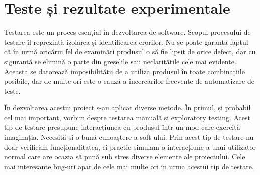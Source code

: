 
\chapter{Teste și rezultate experimentale}
\label{cap:rezultate}

%
%
%

Testarea este un proces esențial în dezvoltarea de software. Scopul procesului de testare îl reprezintă izolarea și identificarea erorilor. Nu se poate garanta faptul că în urmă oricărui fel de examinări produsul o să fie lipsit de orice defect, dar cu siguranță se elimină o parte din greșelile sau neclaritățile cele mai evidente. Aceasta se datorează imposibilității de a utiliza produsul în toate combinațiile posibile, dar de multe ori este o cauză a încercărilor frecvente de automatizare de teste.

În dezvoltarea acestui proiect s-au aplicat diverse metode. În primul, și probabil cel mai important, vorbim despre testarea manuală și exploratory testing. Acest tip de testare presupune interacțiunea cu produsul într-un mod care exercită imaginația. Necesită și o bună cunoaștere a soft-ului. Prin acest tip de testare nu doar verificăm funcționalitatea, ci practic simulam o interacțiune a unui utilizator normal care are ocazia să pună sub stres diverse elemente ale proiectului. Cele mai interesante bug-uri apar de cele mai multe ori în urma acestui tip de testare.

